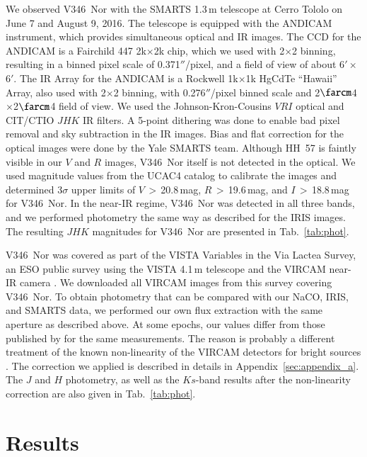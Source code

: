 \documentclass{aa}
\begin{document}
We observed V346~Nor with the SMARTS 1.3\,m telescope at Cerro Tololo
on June 7 and August 9, 2016. The telescope is equipped with the
ANDICAM instrument, which provides simultaneous optical and IR
images. The CCD for the ANDICAM is a Fairchild 447 2k$\times$2k chip,
which we used with 2$\times$2 binning, resulting in a binned pixel
scale of 0.371$''$/pixel, and a field of view of about
6$'\times$6$'$. The IR Array for the ANDICAM is a Rockwell
1k$\times$1k HgCdTe ``Hawaii'' Array, also used with 2$\times$2
binning, with 0.276$''$/pixel binned scale and
2$\farcm$4$\times$2$\farcm$4 field of view. We used the
Johnson-Kron-Cousins $VRI$ optical and CIT/CTIO $JHK$ IR filters. A
5-point dithering was done to enable bad pixel removal and sky
subtraction in the IR images. Bias and flat correction for the optical
images were done by the Yale SMARTS team. Although HH~57 is faintly
visible in our $V$ and $R$ images, V346~Nor itself is not detected in
the optical. We used magnitude values from the UCAC4 catalog
\citep{zacharias2013} to calibrate the images and determined 3$\sigma$
upper limits of $V\,{>}\,$20.8\,mag, $R\,{>}\,$19.6\,mag, and
$I\,{>}\,$18.8\,mag for V346~Nor. In the near-IR regime, V346~Nor was
detected in all three bands, and we performed photometry the same way
as described for the IRIS images. The resulting $JHK$ magnitudes for
V346~Nor are presented in Tab.~\ref{tab:phot}.

V346~Nor was covered as part of the VISTA Variables in the Via Lactea
Survey, an ESO public survey using the VISTA 4.1\,m telescope and the
VIRCAM near-IR camera \citep{minniti2010}. We downloaded all VIRCAM
images from this survey covering V346~Nor. To obtain photometry that
can be compared with our NaCO, IRIS, and SMARTS data, we performed our
own flux extraction with the same aperture as described above. At some
epochs, our values differ from those published by \citet{kraus2016}
for the same measurements. The reason is probably a different
treatment of the known non-linearity of the VIRCAM detectors for
bright sources \citep[e.g.,][]{saito2012}. The correction we applied
is described in details in Appendix~\ref{sec:appendix_a}. The $J$ and
$H$ photometry, as well as the $Ks$-band results after the
non-linearity correction are also given in Tab.~\ref{tab:phot}.

\section{Results}
\end{document}

